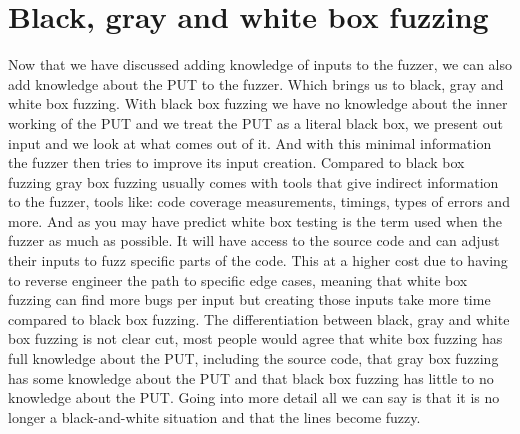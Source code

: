 \section{Black, gray and white box fuzzing}
Now that we have discussed adding knowledge of inputs to the fuzzer, we can also add knowledge about the PUT to the fuzzer. Which brings us to black, gray and white box fuzzing. With black box fuzzing we have no knowledge about the inner working of the PUT and we treat the PUT as a literal black box, we present out input and we look at what comes out of it. And with this minimal information the fuzzer then tries to improve its input creation. 
Compared to black box fuzzing gray box fuzzing usually comes with tools that give indirect information to the fuzzer, tools like: code coverage measurements, timings, types of errors and more.
And as you may have predict white box testing is the term used when the fuzzer as much as possible. It will have access to the source code and can adjust their inputs to fuzz specific parts of the code. This at a higher cost due to having to reverse engineer the path to specific edge cases, meaning that white box fuzzing can find more bugs per input but creating those inputs take more time compared to black box fuzzing.
The differentiation between black, gray and white box fuzzing is not clear cut, most people would agree that white box fuzzing has full knowledge about the PUT, including the source code, that gray box fuzzing has some knowledge about the PUT and that black box fuzzing has little to no knowledge about the PUT. Going into more detail all we can say is that it is no longer a black-and-white situation and that the lines become fuzzy. 


